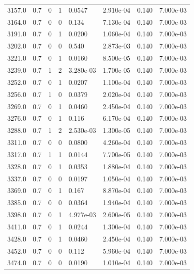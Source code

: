\documentclass[preview]{standalone}
\begin{document}
{{{{{{{\begin{tabular}{L{1.2cm}C{1.2cm} C{0.3cm}C{0.5cm} C{1.4cm}C{1.4cm} C{1.4cm}C{1.4cm}}
  3157.0  &   0.7  & 0     &  1 &  0.0547  & 2.910e-04  & 0.140 &  7.000e-03   \\ 
  3164.0  &   0.7  & 0     &  0 &  0.134  & 7.130e-04  & 0.140 &  7.000e-03   \\ 
  3191.0  &   0.7  & 0     &  1 &  0.0200  & 1.060e-04  & 0.140 &  7.000e-03   \\ 
  3202.0  &   0.7  & 0     &  0 &  0.540  & 2.873e-03  & 0.140 &  7.000e-03   \\ 
  3221.0  &   0.7  & 0     &  1 &  0.0160  & 8.500e-05  & 0.140 &  7.000e-03   \\ 
  3239.0  &   0.7  & 1     &  2 &  3.280e-03  & 1.700e-05  & 0.140 &  7.000e-03   \\ 
  3252.0  &   0.7  & 0     &  1 &  0.0207  & 1.100e-04  & 0.140 &  7.000e-03   \\ 
  3256.0  &   0.7  & 1     &  0 &  0.0379  & 2.020e-04  & 0.140 &  7.000e-03   \\ 
  3269.0  &   0.7  & 0     &  1 &  0.0460  & 2.450e-04  & 0.140 &  7.000e-03   \\ 
  3276.0  &   0.7  & 0     &  1 &  0.116  & 6.170e-04  & 0.140 &  7.000e-03   \\ 
  3288.0  &   0.7  & 1     &  2 &  2.530e-03  & 1.300e-05  & 0.140 &  7.000e-03   \\ 
  3311.0  &   0.7  & 0     &  0 &  0.0800  & 4.260e-04  & 0.140 &  7.000e-03   \\ 
  3317.0  &   0.7  & 1     &  1 &  0.0144  & 7.700e-05  & 0.140 &  7.000e-03   \\ 
  3328.0  &   0.7  & 0     &  1 &  0.0353  & 1.880e-04  & 0.140 &  7.000e-03   \\ 
  3337.0  &   0.7  & 0     &  0 &  0.0197  & 1.050e-04  & 0.140 &  7.000e-03   \\ 
  3369.0  &   0.7  & 0     &  1 &  0.167  & 8.870e-04  & 0.140 &  7.000e-03   \\ 
  3385.0  &   0.7  & 0     &  0 &  0.0364  & 1.940e-04  & 0.140 &  7.000e-03   \\ 
  3398.0  &   0.7  & 0     &  1 &  4.977e-03  & 2.600e-05  & 0.140 &  7.000e-03   \\ 
  3411.0  &   0.7  & 0     &  1 &  0.0244  & 1.300e-04  & 0.140 &  7.000e-03   \\ 
  3428.0  &   0.7  & 0     &  1 &  0.0460  & 2.450e-04  & 0.140 &  7.000e-03   \\ 
  3452.0  &   0.7  & 0     &  0 &  0.112  & 5.960e-04  & 0.140 &  7.000e-03   \\ 
  3474.0  &   0.7  & 0     &  0 &  0.0190  & 1.010e-04  & 0.140 &  7.000e-03   \\ 

\end{tabular}}}}}}}}
\end{document}
